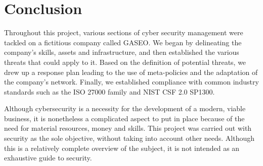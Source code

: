 \documentclass[12pt]{article}
\newcommand{\mycomment}[1]{}
\begin{document}
\newpage
\section{Conclusion}\label{Sec: Conclusion}
Throughout this project, various sections of cyber security management were tackled on a fictitious company called GASEO. 
We began by delineating the company's skills, assets and infrastructure, and then established the various threats that could apply to it. Based on the definition of potential threats, we drew up a response plan leading to the use of meta-policies and the adaptation of the company's network. Finally, we established compliance with common industry standards such as the ISO 27000 family and NIST CSF 2.0 SP1300.

Although cybersecurity is a necessity for the development of a modern, viable business, it is nonetheless a complicated aspect to put in place because of the need for material resources, money and skills.
This project was carried out with security as the sole objective, without taking into account other needs. Although this is a relatively complete overview of the subject, it is not intended as an exhaustive guide to security.





\newpage
\mycomment{
    \newpage
    \appendix
    \renewcommand{\thesection}{\Alph{section}}
    \renewcommand{\thesubsection}{\roman{subsection}}
    \renewcommand{\theequation}{A-\arabic{equation}}
    
    \part*{Appendices}
    \addcontentsline{toc}{part}{Appendices}
    
    
    \section{Example 1}
    
    \section{Example 2}
    
    
    \newpage
    \part*{Bibliography}
    \addcontentsline{toc}{part}{\textit{Bibliography}}
    
    \printbibliography

}
\end{document}
